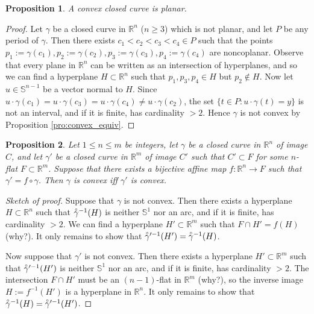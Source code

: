 \documentclass{amsart}
\newtheorem{proposition}{Proposition}[section]
\theoremstyle{definition}
\theoremstyle{remark}
\newcommand{\lring}[1]{\accentset{\circ}{#1}}
\begin{document}
\begin{proposition}
    \label{pro:convex_planar}
    A convex closed curve is planar.
\end{proposition}

\begin{proof}
    Let $\gamma$ be a closed curve in $\mathbb{R}^n$ ($n\ge 3$) which
    is not planar, and let $P$ be any period of $\gamma$.
    Then there exists $c_1<c_2<c_3<c_4\in P$ such that the points
    $p_1:=\gamma(c_1),p_2:=\gamma(c_2),
        p_3:=\gamma(c_3),p_4:=\gamma(c_4)$
    are noncoplanar. Observe that every plane in $\mathbb{R}^n$
    can be written as an intersection of hyperplanes, and so
    we can find a hyperplane $H\subset\mathbb{R}^n$
    such that $p_1,p_3,p_4\in H$ but $p_2\notin H$. Now let
    $u\in\mathbb{S}^{n-1}$ be a vector normal to $H$. Since
    $u\cdot\gamma(c_1)=u\cdot\gamma(c_3)=u\cdot\gamma(c_4)
        \ne u\cdot\gamma(c_2)$,
    the set $\{t\in P:u\cdot\gamma(t)=y\}$ is not an interval,
    and if it is finite, has cardinality $>2$. Hence $\gamma$
    is not convex by Proposition \ref{pro:convex_equiv}.
\end{proof}

\begin{proposition}
    \label{pro:convex_preserved}
    Let $1\le n\le m$ be integers, let $\gamma$ be a closed curve
    in $\mathbb{R}^n$ of image $C$, and let $\gamma'$ be a closed curve
    in $\mathbb{R}^m$ of image $C'$ such that $C'\subset F$
    for some $n$-flat $F\subset\mathbb{R}^m$.
    Suppose that there exists a bijective affine map
    $f:\mathbb{R}^n\to F$ such that $\gamma'=f\circ\gamma$.
    Then $\gamma$ is convex iff $\gamma'$ is convex.
\end{proposition}

\begin{proof}[Sketch of proof]
    Suppose that $\gamma$ is not convex.
    Then there exists a hyperplane $H\subset\mathbb{R}^n$
    such that $\lring{\gamma}^{-1}(H)$ is neither $\mathbb{S}^1$
    nor an arc, and if it is finite, has cardinality $>2$.
    We can find a hyperplane $H'\subset\mathbb{R}^m$ such that
    $F\cap H'=f(H)$ (why?). It only remains to show that
    $\lring{\gamma}'^{-1}(H')=\lring{\gamma}^{-1}(H)$.

    Now suppose that $\gamma'$ is not convex.
    Then there exists a hyperplane $H'\subset\mathbb{R}^m$
    such that $\lring{\gamma}'^{-1}(H')$ is neither $\mathbb{S}^1$
    nor an arc, and if it is finite, has cardinality $>2$.
    The intersection $F\cap H'$ must be an $(n-1)$-flat
    in $\mathbb{R}^m$ (why?), so the inverse image
    $H:=f^{-1}(H')$ is a hyperplane in $\mathbb{R}^n$.
    It only remains to show that
    $\lring{\gamma}^{-1}(H)=\lring{\gamma}'^{-1}(H')$.
\end{proof}
\end{document}
